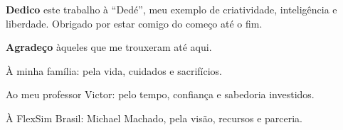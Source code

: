 \documentclass[
    12pt,                %
    openright,           %
    oneside,             %
    a4paper,             %
    english,             %
    spanish,             %
    brazil               %
]{ufscar}
\begin{document}
\cleardoublepage  %

\cleardoublepage  %

\imprimirfolhaderosto

\begin{fichacatalografica}
\end{fichacatalografica}

\begin{folhadeaprovacao}
\end{folhadeaprovacao}

\cleardoublepage %
\vspace*{\fill} %
\begin{flushright}
    \begin{minipage}{0.6\textwidth} %
        \justifying %
        \textbf{Dedico} este trabalho à ``Dedé'', meu exemplo de criatividade, inteligência e liberdade. Obrigado por estar comigo do começo até o fim.
    \end{minipage}
\end{flushright}

\cleardoublepage %


\cleardoublepage %
\vspace*{\fill} %
\begin{flushright}
    \begin{minipage}{0.6\textwidth} %
        \justifying %
        \textbf{Agradeço} àqueles que me trouxeram até aqui.
      
        À minha família: pela vida, cuidados e sacrifícios.

        Ao meu professor Victor: pelo tempo, confiança e sabedoria investidos. 

        À FlexSim Brasil: Michael Machado, pela visão, recursos e parceria.
    \end{minipage}
\end{flushright}
\end{document}
